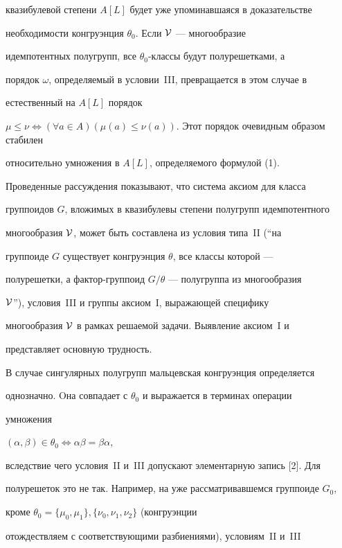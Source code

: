 квазибулевой степени $A[L]$ будет уже упоминавшаяся в доказательстве


необходимости конгруэнция $\theta_0$. Если $\cal V$ --- многообразие


идемпотентных полугрупп, все $\theta_0$-классы будут полурешетками, а


порядок $\omega$, определяемый в условии~III, превращается в этом случае в


естественный на $A[L]$ порядок


$\mu\leqslant\nu\Longleftrightarrow(\forall a\in


A)(\mu(a)\leqslant\nu(a))$. Этот порядок очевидным образом стабилен


относительно умножения в $A[L]$, определяемого формулой (1).





Проведенные рассуждения показывают, что система аксиом для класса


группоидов $G$, вложимых в квазибулевы степени полугрупп идемпотентного


многообразия $\cal V$, может быть составлена из условия типа~II (``на


группоиде $G$ существует конгруэнция $\theta$, все классы которой ---


полурешетки, а фактор-группоид  $G/\theta$ --- полугруппа из многообразия


$\cal V$''), условия~III и группы аксиом~I, выражающей специфику


многообразия $\cal V$ в рамках решаемой задачи. Выявление аксиом~I и


представляет основную трудность.





В случае сингулярных полугрупп мальцевская конгруэнция определяется


однозначно. Oна совпадает с $\theta_0$ и выражается в терминах операции


умножения


$(\alpha,\beta)\in\theta_0\Longleftrightarrow\alpha\beta=\beta\alpha$,


вследствие чего условия~II и~III допускают элементарную запись [2]. Для


полурешеток это не так. Например, на уже рассматривавшемся группоиде $G_0$,


кроме $\theta_0=\{\mu_0,\mu_1\},\{\nu_0,\nu_1,\nu_2\}$ (конгруэнции


отождествляем с соответствующими разбиениями), условиям~II и~III


